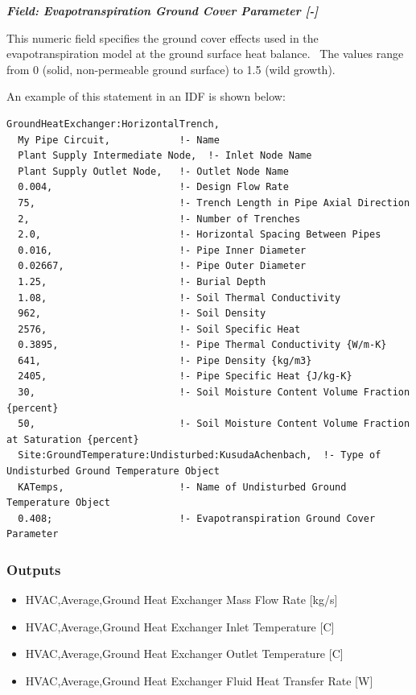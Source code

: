 \textbf{\emph{Field: Evapotranspiration Ground Cover Parameter {[}-{]}}}

This numeric field specifies the ground cover effects used in the evapotranspiration model at the ground surface heat balance.~ The values range from 0 (solid, non-permeable ground surface) to 1.5 (wild growth).

An example of this statement in an IDF is shown below:

\begin{lstlisting}
GroundHeatExchanger:HorizontalTrench,
  My Pipe Circuit,            !- Name
  Plant Supply Intermediate Node,  !- Inlet Node Name
  Plant Supply Outlet Node,   !- Outlet Node Name
  0.004,                      !- Design Flow Rate
  75,                         !- Trench Length in Pipe Axial Direction
  2,                          !- Number of Trenches
  2.0,                        !- Horizontal Spacing Between Pipes
  0.016,                      !- Pipe Inner Diameter
  0.02667,                    !- Pipe Outer Diameter
  1.25,                       !- Burial Depth
  1.08,                       !- Soil Thermal Conductivity
  962,                        !- Soil Density
  2576,                       !- Soil Specific Heat
  0.3895,                     !- Pipe Thermal Conductivity {W/m-K}
  641,                        !- Pipe Density {kg/m3}
  2405,                       !- Pipe Specific Heat {J/kg-K}
  30,                         !- Soil Moisture Content Volume Fraction {percent}
  50,                         !- Soil Moisture Content Volume Fraction at Saturation {percent}
  Site:GroundTemperature:Undisturbed:KusudaAchenbach,  !- Type of Undisturbed Ground Temperature Object
  KATemps,                    !- Name of Undisturbed Ground Temperature Object
  0.408;                      !- Evapotranspiration Ground Cover Parameter
\end{lstlisting}

\subsubsection{Outputs}\label{outputs-14-000}

\begin{itemize}
\item
  HVAC,Average,Ground Heat Exchanger Mass Flow Rate {[}kg/s{]}
\item
  HVAC,Average,Ground Heat Exchanger Inlet Temperature {[}C{]}
\item
  HVAC,Average,Ground Heat Exchanger Outlet Temperature {[}C{]}
\item
  HVAC,Average,Ground Heat Exchanger Fluid Heat Transfer Rate {[}W{]}
\end{itemize}

